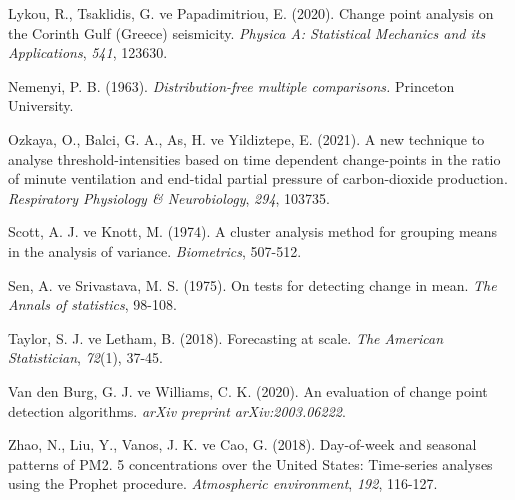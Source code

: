 \documentclass[12pt,twoside]{deuthesis}
\begin{document}
\begin{CSLReferences}{1}{0}
Lykou, R., Tsaklidis, G. ve Papadimitriou, E. (2020). Change point analysis on the Corinth Gulf (Greece) seismicity. \emph{Physica A: Statistical Mechanics and its Applications}, \emph{541}, 123630.

Nemenyi, P. B. (1963). \emph{Distribution-free multiple comparisons.} Princeton University.

Ozkaya, O., Balci, G. A., As, H. ve Yildiztepe, E. (2021). A new technique to analyse threshold-intensities based on time dependent change-points in the ratio of minute ventilation and end-tidal partial pressure of carbon-dioxide production. \emph{Respiratory Physiology \& Neurobiology}, \emph{294}, 103735.

Scott, A. J. ve Knott, M. (1974). A cluster analysis method for grouping means in the analysis of variance. \emph{Biometrics}, 507-512.

Sen, A. ve Srivastava, M. S. (1975). On tests for detecting change in mean. \emph{The Annals of statistics}, 98-108.

Taylor, S. J. ve Letham, B. (2018). Forecasting at scale. \emph{The American Statistician}, \emph{72}(1), 37-45.

Van den Burg, G. J. ve Williams, C. K. (2020). An evaluation of change point detection algorithms. \emph{arXiv preprint arXiv:2003.06222}.

Zhao, N., Liu, Y., Vanos, J. K. ve Cao, G. (2018). Day-of-week and seasonal patterns of PM2. 5 concentrations over the United States: Time-series analyses using the Prophet procedure. \emph{Atmospheric environment}, \emph{192}, 116-127.

\end{CSLReferences}

\setlength{\parindent}{-0.20in}
\setlength{\leftskip}{0.20in}
\setlength{\parskip}{8pt}
\end{document}
